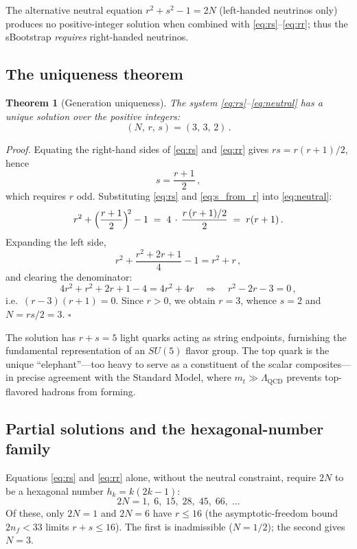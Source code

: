 \documentclass[12pt,a4paper]{article}
\begin{document}
\noindent
The alternative neutral equation $r^2 + s^2 - 1 = 2N$ (left-handed
neutrinos only) produces no positive-integer solution when combined
with \eqref{eq:rs}--\eqref{eq:rr}; thus the sBootstrap \emph{requires}
right-handed neutrinos.

\subsection{The uniqueness theorem}

\medskip
\noindent\textbf{Theorem 1} (Generation uniqueness).
\textit{The system \eqref{eq:rs}--\eqref{eq:neutral} has a unique
solution over the positive integers:}
\begin{equation}
\boxed{(N,\,r,\,s) = (3,\,3,\,2)\,.}
\end{equation}

\medskip
\noindent\textit{Proof.}
Equating the right-hand sides of \eqref{eq:rs} and \eqref{eq:rr}
gives $rs = r(r+1)/2$, hence
\begin{equation}
\label{eq:s_from_r}
s = \frac{r+1}{2}\,,
\end{equation}
which requires $r$ odd.  Substituting \eqref{eq:rs} and
\eqref{eq:s_from_r} into \eqref{eq:neutral}:
\[
r^2 + \Bigl(\frac{r+1}{2}\Bigr)^{\!2} - 1 \;=\; 4\,\cdot\,\frac{r\,(r+1)/2}{2}
\;=\; r(r+1)\,.
\]
Expanding the left side,
\[
r^2 + \frac{r^2 + 2r + 1}{4} - 1 = r^2 + r\,,
\]
and clearing the denominator:
\[
4r^2 + r^2 + 2r + 1 - 4 = 4r^2 + 4r
\quad\Longrightarrow\quad
r^2 - 2r - 3 = 0\,,
\]
i.e.\ $(r-3)(r+1) = 0$.  Since $r > 0$, we obtain $r = 3$, whence
$s = 2$ and $N = rs/2 = 3$.
\hfill$\square$

\medskip
The solution has $r + s = 5$ light quarks acting as string endpoints,
furnishing the fundamental representation of an $SU(5)$ flavor group.
The top quark is the unique ``elephant''---too heavy to serve as a
constituent of the scalar composites---in precise agreement with the
Standard Model, where $m_t \gg \Lambda_{\text{QCD}}$ prevents
top-flavored hadrons from forming.

\subsection{Partial solutions and the hexagonal-number family}
Equations \eqref{eq:rs} and \eqref{eq:rr} alone, without the
neutral constraint, require $2N$ to be a hexagonal number
$h_k = k(2k-1)$:
\[
2N = 1,\; 6,\; 15,\; 28,\; 45,\; 66,\; \ldots
\]
Of these, only $2N = 1$ and $2N = 6$ have $r \leq 16$ (the
asymptotic-freedom bound $2n_f < 33$ limits $r + s \leq 16$).
The first is inadmissible ($N = 1/2$); the second gives $N = 3$.
\end{document}

